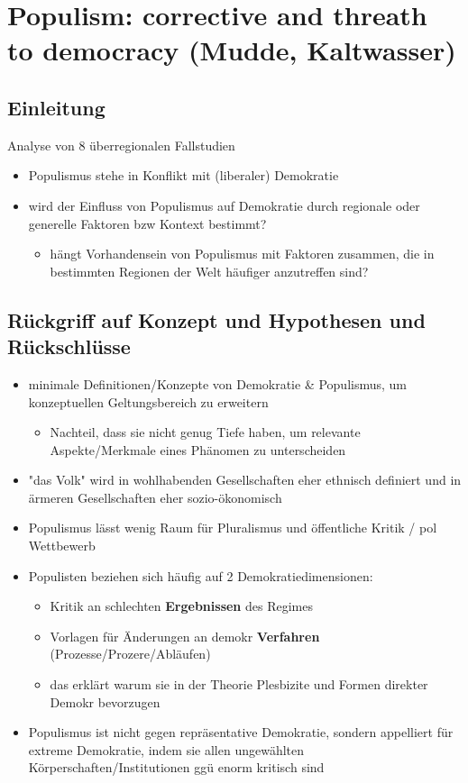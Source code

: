 \documentclass[11pt]{article}
\date{\today}
\title{}
\begin{document}
\tableofcontents

\section{Populism: corrective and threath to democracy (Mudde, Kaltwasser)}
\label{sec:org47c3ff4}
\subsection{Einleitung}
\label{sec:org25977be}
Analyse von 8 überregionalen Fallstudien 
\begin{itemize}
\item Populismus stehe in Konflikt mit (liberaler) Demokratie
\item wird der Einfluss von Populismus auf Demokratie durch regionale oder generelle Faktoren bzw Kontext bestimmt?
\begin{itemize}
\item hängt Vorhandensein von Populismus mit Faktoren zusammen, die in bestimmten Regionen der Welt häufiger anzutreffen sind?
\end{itemize}
\end{itemize}
\subsection{Rückgriff auf Konzept und Hypothesen und Rückschlüsse}
\label{sec:org27d7c12}
\begin{itemize}
\item minimale Definitionen/Konzepte von Demokratie \& Populismus, um konzeptuellen Geltungsbereich zu erweitern
\begin{itemize}
\item Nachteil, dass sie nicht genug Tiefe haben, um relevante Aspekte/Merkmale eines Phänomen zu unterscheiden
\end{itemize}
\item "das Volk" wird in wohlhabenden Gesellschaften eher ethnisch definiert und in ärmeren Gesellschaften eher sozio-ökonomisch
\item Populismus lässt wenig Raum für Pluralismus und öffentliche Kritik / pol Wettbewerb
\item Populisten beziehen sich häufig auf 2 Demokratiedimensionen:
\begin{itemize}
\item Kritik an schlechten \textbf{Ergebnissen} des Regimes
\item Vorlagen für Änderungen an demokr \textbf{Verfahren} (Prozesse/Prozere/Abläufen)
\item das erklärt warum sie in der Theorie Plesbizite und Formen direkter Demokr bevorzugen
\end{itemize}
\item Populismus ist nicht gegen repräsentative Demokratie, sondern appelliert für extreme Demokratie, indem sie allen ungewählten Körperschaften/Institutionen ggü enorm kritisch sind
\end{itemize}
\end{document}
